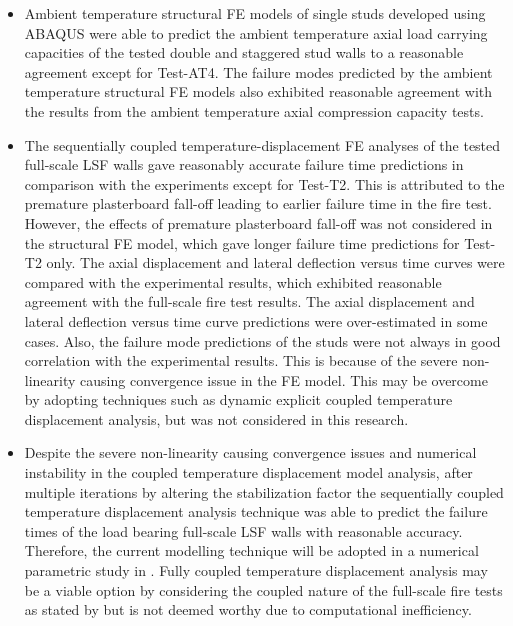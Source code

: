 \begin{itemize}
	\item Ambient temperature structural FE models of single studs developed using ABAQUS were able to predict the ambient temperature axial load carrying capacities of the tested double and staggered stud walls to a reasonable agreement except for Test-AT4. The failure modes predicted by the ambient temperature structural FE models also exhibited reasonable agreement with the results from the ambient temperature axial compression capacity tests.     
	\item The sequentially coupled temperature-displacement FE analyses of the tested full-scale LSF walls gave reasonably accurate failure time predictions in comparison with the experiments except for Test-T2. This is attributed to the premature plasterboard fall-off leading to earlier failure time in the fire test. However, the effects of premature plasterboard fall-off was not considered in the structural FE model, which gave longer failure time predictions for Test-T2 only. The axial displacement and lateral deflection versus time curves were compared with the experimental results, which exhibited reasonable agreement with the full-scale fire test results. The axial displacement and lateral deflection versus time curve predictions were over-estimated in some cases. Also, the failure mode predictions of the studs were not always in good correlation with the experimental results. This is because of the severe non-linearity causing convergence issue in the FE model. This may be overcome by adopting techniques such as dynamic explicit coupled temperature displacement analysis, but was not considered in this research.  
	\item Despite the severe non-linearity causing convergence issues and numerical instability in the coupled temperature displacement model analysis, after multiple iterations by altering the stabilization factor the sequentially coupled temperature displacement analysis technique was able to predict the failure times of the load bearing full-scale LSF walls with reasonable accuracy. Therefore, the current modelling technique will be adopted in a numerical parametric study in . Fully coupled temperature displacement analysis may be a viable option by considering the coupled nature of the full-scale fire tests as stated by \citet{Rusthi2018,Dias2019d} but is not deemed worthy due to computational inefficiency. 
\end{itemize}